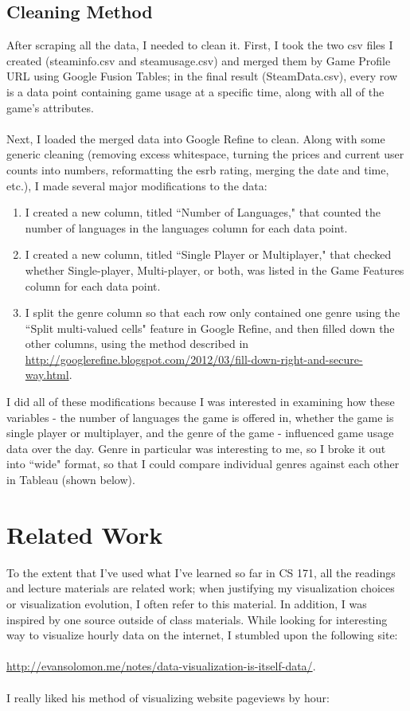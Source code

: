 \documentclass[pdftex,12pt,a4paper]{article}
\begin{document}
\subsection{Cleaning Method}
After scraping all the data, I needed to clean it. First, I took the two csv files I created (steaminfo.csv and steamusage.csv) and merged them by Game Profile URL using Google Fusion Tables; in the final result (SteamData.csv), every row is a data point containing game usage at a specific time, along with all of the game's attributes. \\ \\

Next, I loaded the merged data into Google Refine to clean. Along with some generic cleaning (removing excess whitespace, turning the prices and current user counts into numbers, reformatting the esrb rating, merging the date and time, etc.), I made several major modifications to the data:
\begin{enumerate}
\item I created a new column, titled ``Number of Languages," that counted the number of languages in the languages column for each data point.
\item I created a new column, titled ``Single Player or Multiplayer," that checked whether Single-player, Multi-player, or both, was listed in the Game Features column for each data point.
\item I split the genre column so that each row only contained one genre using the ``Split multi-valued cells" feature in Google Refine, and then filled down the other columns, using the method described in \url{http://googlerefine.blogspot.com/2012/03/fill-down-right-and-secure-way.html}.
\end{enumerate}
I did all of these modifications because I was interested in examining how these variables - the number of languages the game is offered in, whether the game is single player or multiplayer, and the genre of the game - influenced game usage data over the day. Genre in particular was interesting to me, so I broke it out into ``wide" format, so that I could compare individual genres against each other in Tableau (shown below). 

\section{Related Work}
To the extent that I've used what I've learned so far in CS 171, all the readings and lecture materials are related work; when justifying my visualization choices or visualization evolution, I often refer to this material. In addition, I was inspired by one source outside of class materials. While looking for interesting way to visualize hourly data on the internet, I stumbled upon the following site: \\ \\
\url{http://evansolomon.me/notes/data-visualization-is-itself-data/}. \\ \\
I really liked his method of visualizing website pageviews by hour: \\ \\
\end{document}
